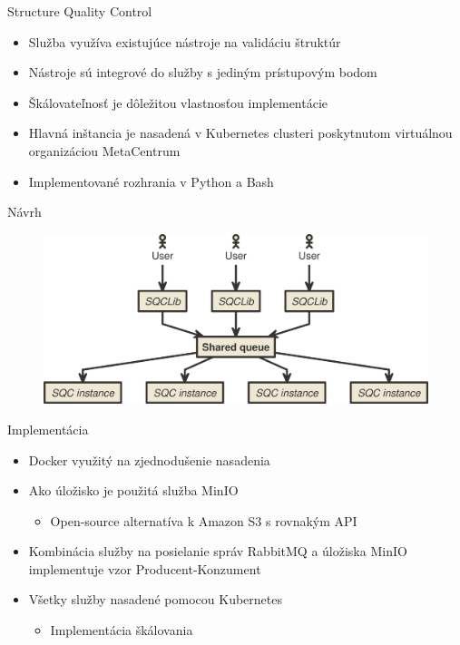 \documentclass[
  aspectratio=169,
]{beamer}
\begin{document}
\begin{frame}{Structure Quality Control}
\begin{itemize}
  \item Služba využíva existujúce nástroje na validáciu štruktúr
  \item Nástroje sú integrové do služby s jediným prístupovým bodom
  \item Škálovateľnosť je dôležitou vlastnosťou implementácie
  \item Hlavná inštancia je nasadená v Kubernetes clusteri poskytnutom virtuálnou organizáciou MetaCentrum
  \item Implementované rozhrania v Python a Bash
\end{itemize}
\end{frame}

\begin{frame}{Návrh}
\begin{figure}
  \includegraphics[width=.8\textwidth,height=.8\textheight,keepaspectratio]{img/diagram.png}
\end{figure}
\end{frame}

\begin{frame}{Implementácia}
\begin{itemize}
  \item Docker využitý na zjednodušenie nasadenia
  \item Ako úložisko je použitá služba MinIO
  \begin{itemize}
    \item Open-source alternatíva k Amazon S3 s rovnakým API
  \end{itemize}
  \item Kombinácia služby na posielanie správ RabbitMQ a úložiska MinIO
        implementuje vzor Producent-Konzument
  \item Všetky služby nasadené pomocou Kubernetes
  \begin{itemize}
    \item Implementácia škálovania
  \end{itemize}
\end{itemize}
\end{frame}
\end{document}
